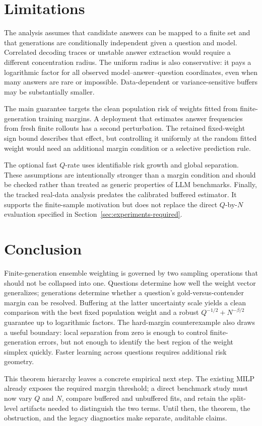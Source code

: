 \section{Limitations}
\label{sec:limitations}

The analysis assumes that candidate answers can be mapped to a finite set and
that generations are conditionally independent given a question and model.
Correlated decoding traces or unstable answer extraction would require a
different concentration radius.  The uniform radius is also conservative: it
pays a logarithmic factor for all observed model--answer--question
coordinates, even when many answers are rare or impossible.  Data-dependent
or variance-sensitive buffers may be substantially smaller.

The main guarantee targets the clean population risk of weights fitted from
finite-generation training margins.  A deployment that estimates answer
frequencies from fresh finite rollouts has a second perturbation.  The retained
fixed-weight sign bound describes that effect, but controlling it uniformly at
the random fitted weight would need an additional margin condition or a
selective prediction rule.

The optional fast \(Q\)-rate uses identifiable risk growth and global
separation.  These assumptions are intentionally stronger than a margin
condition and should be checked rather than treated as generic properties of
LLM benchmarks.  Finally, the tracked real-data analysis predates the
calibrated buffered estimator.  It supports the finite-sample motivation but
does not replace the direct \(Q\)-by-\(N\) evaluation specified in
Section~\ref{sec:experiments-required}.

\section{Conclusion}
\label{sec:conclusion}

Finite-generation ensemble weighting is governed by two sampling operations
that should not be collapsed into one.  Questions determine how well the
weight vector generalizes; generations determine whether a question's
gold-versus-contender margin can be resolved.  Buffering at the latter
uncertainty scale yields a clean comparison with the best fixed population
weight and a robust \(Q^{-1/2}+N^{-\beta/2}\) guarantee up to logarithmic
factors.  The hard-margin counterexample also draws a useful boundary: local
separation from zero is enough to control finite-generation errors, but not
enough to identify the best region of the weight simplex quickly.  Faster
learning across questions requires additional risk geometry.

This theorem hierarchy leaves a concrete empirical next step.  The existing
MILP already exposes the required margin threshold; a direct benchmark study
must now vary \(Q\) and \(N\), compare buffered and unbuffered fits, and retain
the split-level artifacts needed to distinguish the two terms.  Until then,
the theorem, the obstruction, and the legacy diagnostics make separate,
auditable claims.

